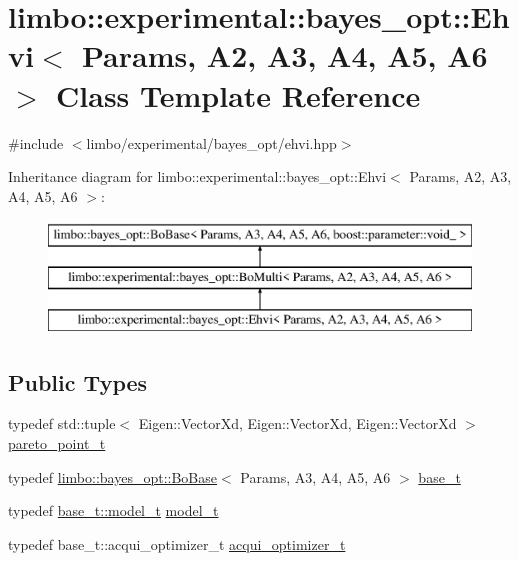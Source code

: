 \hypertarget{classlimbo_1_1experimental_1_1bayes__opt_1_1_ehvi}{}\section{limbo\+:\+:experimental\+:\+:bayes\+\_\+opt\+:\+:Ehvi$<$ Params, A2, A3, A4, A5, A6 $>$ Class Template Reference}
\label{classlimbo_1_1experimental_1_1bayes__opt_1_1_ehvi}


{\ttfamily \#include $<$limbo/experimental/bayes\+\_\+opt/ehvi.\+hpp$>$}

Inheritance diagram for limbo\+:\+:experimental\+:\+:bayes\+\_\+opt\+:\+:Ehvi$<$ Params, A2, A3, A4, A5, A6 $>$\+:\begin{figure}[H]
\begin{center}
\leavevmode
\includegraphics[height=3.000000cm]{classlimbo_1_1experimental_1_1bayes__opt_1_1_ehvi}
\end{center}
\end{figure}
\subsection*{Public Types}
\begin{DoxyCompactItemize}
\item 
typedef std\+::tuple$<$ Eigen\+::\+Vector\+Xd, Eigen\+::\+Vector\+Xd, Eigen\+::\+Vector\+Xd $>$ \hyperlink{classlimbo_1_1experimental_1_1bayes__opt_1_1_ehvi_a98176e0f540cebc76616142da6fbca6e}{pareto\+\_\+point\+\_\+t}
\item 
typedef \hyperlink{classlimbo_1_1bayes__opt_1_1_bo_base}{limbo\+::bayes\+\_\+opt\+::\+Bo\+Base}$<$ Params, A3, A4, A5, A6 $>$ \hyperlink{classlimbo_1_1experimental_1_1bayes__opt_1_1_ehvi_aab1a707afba4fe47658755ca5b66a77e}{base\+\_\+t}
\item 
typedef \hyperlink{classlimbo_1_1bayes__opt_1_1_bo_base_a1ddc93cc023a2d7d527deb4cc750624e}{base\+\_\+t\+::model\+\_\+t} \hyperlink{classlimbo_1_1experimental_1_1bayes__opt_1_1_ehvi_af9a1e49996eb15f36e08a7398e3b024e}{model\+\_\+t}
\item 
typedef base\+\_\+t\+::acqui\+\_\+optimizer\+\_\+t \hyperlink{classlimbo_1_1experimental_1_1bayes__opt_1_1_ehvi_a0bcaf7560c3d5cb4f18f2b6b3cbd521f}{acqui\+\_\+optimizer\+\_\+t}
\end{DoxyCompactItemize}

